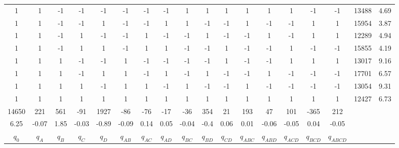\documentclass[11pt]{article}
\begin{document}
\begin{landscape}
\begin{table}[]
\begin{tabular}{|cccccccccccccccc|cc|}
		1 & 1 & -1 & -1 & -1 & -1 & -1 & -1 & 1 & 1 & 1 & 1 & 1 & 1 & -1 & -1 & 13488 & 4.69 \\
		1 & 1 & -1 & -1 & 1 & -1 & -1 & 1 & 1 & -1 & -1 & 1 & -1 & -1 & 1 & 1 & 15954 & 3.87 \\
		1 & 1 & -1 & 1 & -1 & -1 & 1 & -1 & -1 & 1 & -1 & -1 & 1 & -1 & 1 & 1 & 12289 & 4.94 \\
		1 & 1 & -1 & 1 & 1 & -1 & 1 & 1 & -1 & -1 & 1 & -1 & -1 & 1 & -1 & -1 & 15855 & 4.19 \\
		1 & 1 & 1 & -1 & -1 & 1 & -1 & -1 & -1 & -1 & 1 & -1 & -1 & 1 & 1 & 1 & 13017 & 9.16 \\
		1 & 1 & 1 & -1 & 1 & 1 & -1 & 1 & -1 & 1 & -1 & -1 & 1 & -1 & -1 & -1 & 17701 & 6.57 \\
		1 & 1 & 1 & 1 & -1 & 1 & 1 & -1 & 1 & -1 & -1 & 1 & -1 & -1 & -1 & -1 & 13054 & 9.31 \\
		1 & 1 & 1 & 1 & 1 & 1 & 1 & 1 & 1 & 1 & 1 & 1 & 1 & 1 & 1 & 1 & 12427 & 6.73 \\ \hline
		14650 & 221 & 561 & -91 & 1927 & -86 & -76 & -17 & -36 & 354 & 21 & 193 & 47 & 101 & -365 & 212 \\
		6.25 & -0.07 & 1.85 & -0.03 & -0.89 & -0.09 & 0.14 & 0.05 & -0.04 & -0.4 & 0.06 & 0.01 & -0.06 & -0.05 & 0.04 & -0.05 \\ \hline
		$q_{0}$ & $q_{A}$ & $q_{B}$ & $q_{C}$ & $q_{D}$ & $q_{AB}$ & $q_{AC}$ & $q_{AD}$ & $q_{BC}$ & $q_{BD}$ & $q_{CD}$ & $q_{ABC}$ & $q_{ABD}$ & $q_{ACD}$ & $q_{BCD}$ & $q_{ABCD}$ & 
	\end{tabular}
\end{table}
\end{landscape}
\end{document}
